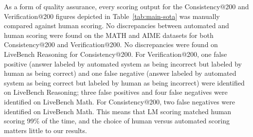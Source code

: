 As a form of quality assurance, every scoring output for the Consistency@200 and Verification@200 figures depicted in Table~\ref{tab:main-sota} was manually compared against human scoring.
No discrepancies between automated and human scoring were found on the MATH and AIME datasets for both Consistency@200 and Verification@200.
No discrepancies were found on LiveBench Reasoning for Consistency@200.
For Verification@200, one false positive (answer labeled by automated system as being incorrect but labeled by human as being correct) and one false negative  (answer labeled by automated system as being correct but labeled by human as being incorrect) were identified on LiveBench Reasoning; three false positives and four false negatives were identified on LiveBench Math.
For Consistency@200, two false negatives were identified on LiveBench Math.
This means that LM scoring matched human scoring 99\% of the time, and the choice of human versus automated scoring matters little to our results.

